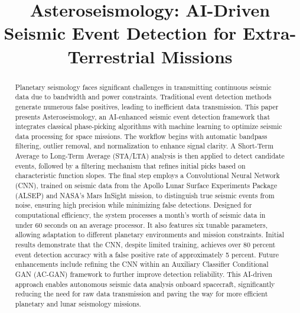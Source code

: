 \documentclass[conference]{IEEEtran}
\begin{document}
\title{Asteroseismology: AI-Driven Seismic Event Detection for Extra-Terrestrial Missions\\
}

\author{
    \and
}

\maketitle

\begin{abstract}
    Planetary seismology faces significant challenges in transmitting continuous seismic data due to bandwidth and power
    constraints. Traditional event detection methods generate numerous false positives, leading to inefficient data
    transmission. This paper presents Asteroseismology, an AI-enhanced seismic event detection framework that integrates
    classical phase-picking algorithms with machine learning to optimize seismic data processing for space missions. The
    workflow begins with automatic bandpass filtering, outlier removal, and normalization to enhance signal clarity. A
    Short-Term Average to Long-Term Average (STA/LTA) analysis is then applied to detect candidate events, followed by a
    filtering mechanism that refines initial picks based on characteristic function slopes. The final step employs a
    Convolutional Neural Network (CNN), trained on seismic data from the Apollo Lunar Surface Experiments Package
    (ALSEP) and NASA’s Mars InSight mission, to distinguish true seismic events from noise, ensuring high precision
    while minimizing false detections. Designed for computational efficiency, the system processes a month’s worth of
    seismic data in under 60 seconds on an average processor. It also features six tunable parameters, allowing
    adaptation to different planetary environments and mission constraints. Initial results demonstrate that the CNN,
    despite limited training, achieves over 80 percent event detection accuracy with a false positive rate of
    approximately 5 percent. Future enhancements include refining the CNN within an Auxiliary Classifier Conditional GAN
    (AC-GAN) framework to further improve detection reliability. This AI-driven approach enables autonomous seismic data
    analysis onboard spacecraft, significantly reducing the need for raw data transmission and paving the way for more
    efficient planetary and lunar seismology missions.
\end{abstract}
\end{document}
